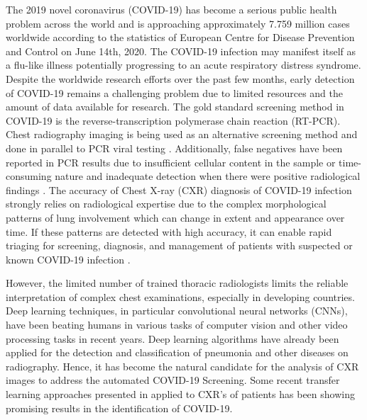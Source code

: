  The 2019 novel coronavirus (COVID-19) has become a serious public health problem across the world and is approaching approximately 7.759 million cases worldwide according to the statistics of European Centre for Disease Prevention and Control on June 14th, 2020. The COVID-19 infection may manifest itself as a flu-like illness potentially progressing to an acute respiratory distress syndrome. Despite the worldwide research efforts over the past few months, early detection of COVID-19 remains a challenging problem due to limited resources and the amount of data available for research. The gold standard screening method in COVID-19 is the reverse-transcription polymerase chain reaction (RT-PCR). Chest radiography imaging is being used as an alternative screening method and done in parallel to PCR viral testing  \cite{wang2020covid}.  Additionally, false negatives have been reported in PCR results due to insufficient cellular content in the sample or time-consuming nature and inadequate detection when there were positive radiological findings \cite{araujo2020covid}. The accuracy of Chest X-ray (CXR) diagnosis of COVID-19 infection strongly relies on radiological expertise due to the complex morphological patterns of lung involvement which can change in extent and appearance over time. If these patterns are detected with high accuracy, it can enable rapid triaging for
screening, diagnosis, and management of patients with suspected or known COVID-19 infection \cite{luz2020efficient}.

However, the limited number of trained thoracic radiologists limits the reliable interpretation of complex chest examinations, especially in developing countries. Deep learning techniques, in particular convolutional neural networks (CNNs), have been beating humans in various tasks of computer vision and other video processing tasks in recent years. Deep learning algorithms have already been applied for the detection and classification of pneumonia \cite{rajpurkar2017chexnet, zech2018variable} and other diseases on radiography. Hence, it has become the natural candidate for the analysis of CXR images to address the automated COVID-19 Screening. Some recent transfer learning approaches presented in \cite{chowdhury2020can, wang2020covid, butt2020deep, farooq2020covid, luz2020efficient} applied to CXR's of patients has been showing promising results in the identification of COVID-19. 
 
